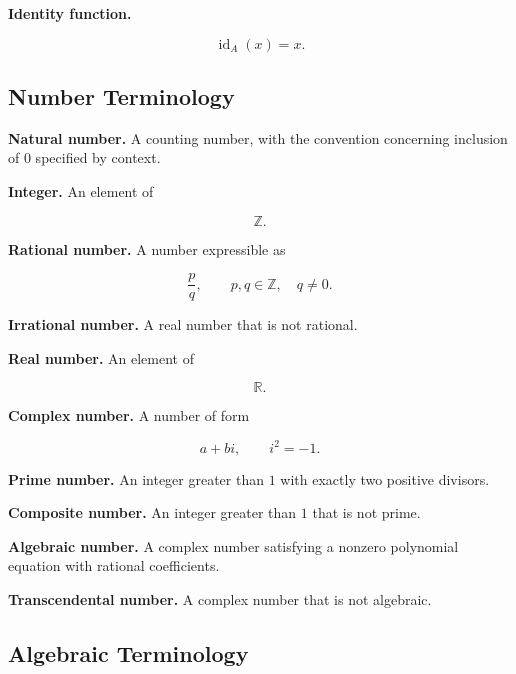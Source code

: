 \textbf{Identity function.}

\[
\boxed{
\operatorname{id}_A(x)=x.
}
\]

\subsection{Number Terminology}
\label{subsec:number-terminology-reference}

\textbf{Natural number.}
A counting number, with the convention concerning inclusion of \(0\)
specified by context.

\medskip

\textbf{Integer.}
An element of

\[
\boxed{
\mathbb{Z}.
}
\]

\medskip

\textbf{Rational number.}
A number expressible as

\[
\boxed{
\frac pq,
\qquad
p,q\in\mathbb{Z},
\quad
q\neq0.
}
\]

\medskip

\textbf{Irrational number.}
A real number that is not rational.

\medskip

\textbf{Real number.}
An element of

\[
\boxed{
\mathbb{R}.
}
\]

\medskip

\textbf{Complex number.}
A number of form

\[
\boxed{
a+bi,
\qquad
i^2=-1.
}
\]

\medskip

\textbf{Prime number.}
An integer greater than \(1\) with exactly two positive divisors.

\medskip

\textbf{Composite number.}
An integer greater than \(1\) that is not prime.

\medskip

\textbf{Algebraic number.}
A complex number satisfying a nonzero polynomial equation with rational
coefficients.

\medskip

\textbf{Transcendental number.}
A complex number that is not algebraic.

\subsection{Algebraic Terminology}
\label{subsec:algebraic-terminology-reference}

